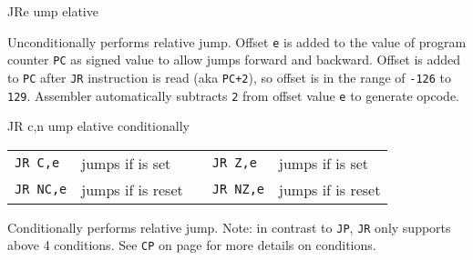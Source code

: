 \begin{basedescript}{
	\desclabelstyle{\multilinelabel}
	\desclabelwidth{3cm}}
	\begin{DetailItem}{JR}{e}
		{ump elative}
		{}
		
		Unconditionally performs relative jump. Offset {\tt e} is added to the value of program counter {\tt PC} as signed value to allow jumps forward and backward. Offset is added to {\tt PC} after {\tt JR} instruction is read (aka {\tt PC+2}), so offset is in the range of {\tt -126} to {\tt 129}. Assembler automatically subtracts {\tt 2} from offset value {\tt e} to generate opcode.

		\begin{DetailEffects}
			\FlagsJRn
		\end{DetailEffects}
				
		\begin{DetailTiming}
			\DetailTime{3}{12}
		\end{DetailTiming}

	\end{DetailItem}


	\begin{DetailItem}{JR c,n}{}
		{ump elative conditionally}
		{\SymJRc{c}{n}}

		\vspace{1ex} %
		\begin{tabular}{@{}llcll}
			{\tt JR C,e} & jumps if \FlagCF{} is set & &
				{\tt JR Z,e} & jumps if \FlagZF{} is set\\
			{\tt JR NC,e} & jumps if \FlagCF{} is reset & &
				{\tt JR NZ,e} & jumps if \FlagZF{} is reset\\
		\end{tabular}
		
		Conditionally performs relative jump. Note: in contrast to {\tt JP}, {\tt JR} only supports above 4 conditions. See {\tt CP} on page  for more details on conditions.

		\begin{DetailEffects}
			\FlagsJRccn
		\end{DetailEffects}
						

\end{DetailItem}
\end{basedescript}

